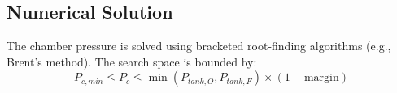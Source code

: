 \subsection{Numerical Solution}
The chamber pressure is solved using bracketed root-finding algorithms (e.g., Brent's method). The search space is bounded by:
\begin{equation}
P_{c,min} \le P_c \le \min(P_{tank,O}, P_{tank,F}) \times (1 - \text{margin})
\end{equation}

